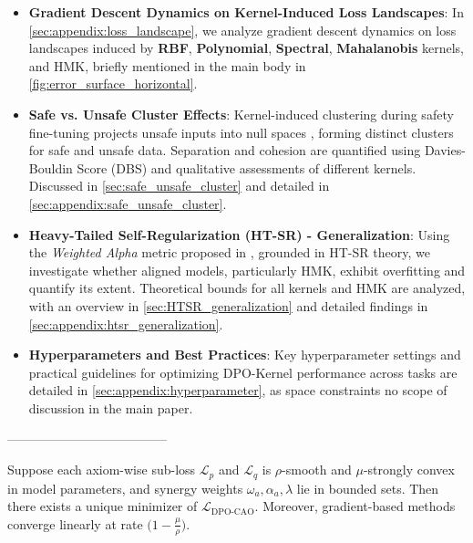\begin{itemize}[leftmargin=15pt,nolistsep]
\item[\ding{93}] \textbf{Gradient Descent Dynamics on Kernel-Induced Loss Landscapes}: In \cref{sec:appendix:loss_landscape}, we analyze gradient descent dynamics on loss landscapes induced by \textbf{RBF}, \textbf{Polynomial}, \textbf{Spectral}, \textbf{Mahalanobis} kernels, and HMK, briefly mentioned in the main body in \cref{fig:error_surface_horizontal}.

\item[\ding{93}] \textbf{Safe vs. Unsafe Cluster Effects}: Kernel-induced clustering during safety fine-tuning projects unsafe inputs into null spaces \cite{jain2024safetyfinetuning}, forming distinct clusters for safe and unsafe data. Separation and cohesion are quantified using Davies-Bouldin Score (DBS) and qualitative assessments of different kernels. Discussed in \cref{sec:safe_unsafe_cluster} and detailed in \cref{sec:appendix:safe_unsafe_cluster}.




\item[\ding{93}] \textbf{Heavy-Tailed Self-Regularization (HT-SR) - Generalization}: Using the \textit{Weighted Alpha} metric proposed in \cite{martin2021predicting}, grounded in HT-SR theory, we investigate whether aligned models, particularly HMK, exhibit overfitting and quantify its extent. Theoretical bounds for all kernels and HMK are analyzed, with an overview in \cref{sec:HTSR_generalization} and detailed findings in \cref{sec:appendix:htsr_generalization}.


\item[\ding{93}] \textbf{Hyperparameters and Best Practices}: Key hyperparameter settings and practical guidelines for optimizing DPO-Kernel performance across tasks are detailed in \cref{sec:appendix:hyperparameter}, as space constraints no scope of discussion in the main paper.


\end{itemize}



--------------------------------------




\begin{theorem}
\label{thm:unique-equilibrium}
Suppose each axiom-wise sub-loss \(\mathcal{L}_p\) and \(\mathcal{L}_q\) is \(\rho\)-smooth and \(\mu\)-strongly convex in model parameters, and synergy weights \(\omega_a, \alpha_a, \lambda\) lie in bounded sets. Then there exists a unique minimizer of \(\mathcal{L}_{\text{DPO-CAO}}\). Moreover, gradient-based methods converge linearly at rate \(\bigl(1 - \tfrac{\mu}{\rho}\bigr)\).
\end{theorem}

